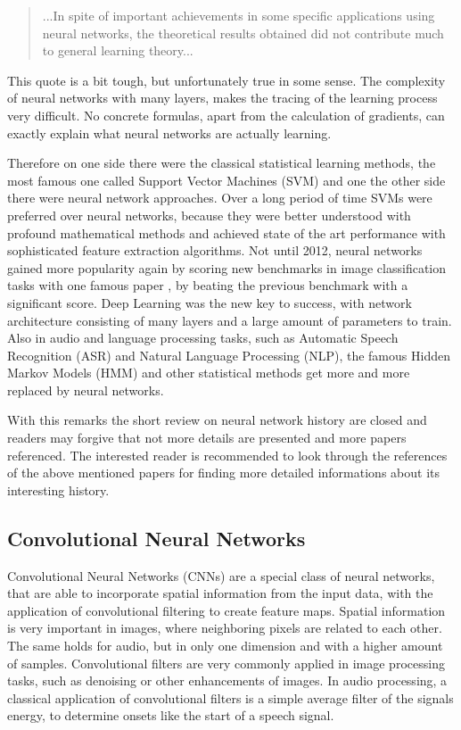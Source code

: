 \begin{quote}
...In spite of important achievements in some specific applications using neural networks, the theoretical results obtained did not contribute much to general learning theory...
\end{quote}

This quote is a bit tough, but unfortunately true in some sense. 
The complexity of neural networks with many layers, makes the tracing of the learning process very difficult.
No concrete formulas, apart from the calculation of gradients, can exactly explain what neural networks are actually learning.

Therefore on one side there were the classical statistical learning methods, the most famous one called Support Vector Machines (SVM) \cite{Cortes1995} and one the other side there were neural network approaches.
Over a long period of time SVMs were preferred over neural networks, because they were better understood with profound mathematical methods and achieved state of the art performance with sophisticated feature extraction algorithms.
Not until 2012, neural networks gained more popularity again by scoring new benchmarks in image classification tasks with one famous paper \cite{Krizhevsky2012}, by beating the previous benchmark with a significant score.
Deep Learning was the new key to success, with network architecture consisting of many layers and a large amount of parameters to train.
Also in audio and language processing tasks, such as Automatic Speech Recognition (ASR) and Natural Language Processing (NLP), the famous Hidden Markov Models (HMM) and other statistical methods get more and more replaced by neural networks.

With this remarks the short review on neural network history are closed and readers may forgive that not more details are presented and more papers referenced.
The interested reader is recommended to look through the references of the above mentioned papers for finding more detailed informations about its interesting history.



\subsection{Convolutional Neural Networks}\label{sec:prev_nn_cnn}
Convolutional Neural Networks (CNNs) are a special class of neural networks, that are able to incorporate spatial information from the input data, with the application of convolutional filtering to create feature maps.
Spatial information is very important in images, where neighboring pixels are related to each other.
The same holds for audio, but in only one dimension and with a higher amount of samples.
Convolutional filters are very commonly applied in image processing tasks, such as denoising or other enhancements of images.
In audio processing, a classical application of convolutional filters is a simple average filter of the signals energy, to determine onsets like the start of a speech signal.


